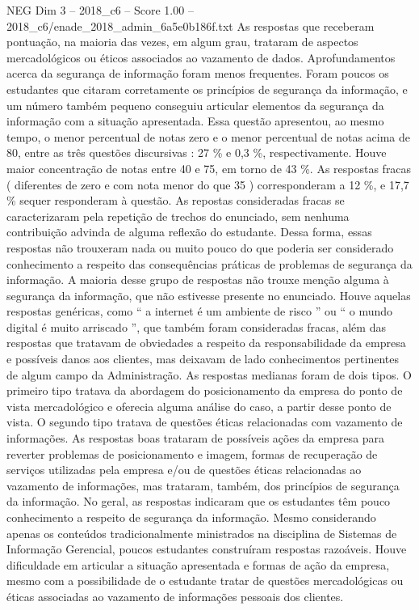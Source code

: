 \begin{textsample}{NEG Dim 3 – 2018\_c6 – Score 1.00 – 2018\_c6/enade\_2018\_admin\_6a5e0b186f.txt}
As respostas que receberam pontuação, na maioria das vezes, em algum grau, trataram de aspectos mercadológicos ou éticos associados ao vazamento de dados.
Aprofundamentos acerca da segurança de informação foram menos frequentes.
Foram poucos os estudantes que citaram corretamente os princípios de segurança da informação, e um número também pequeno conseguiu articular elementos da segurança da informação com a situação apresentada.
Essa questão apresentou, ao mesmo tempo, o menor percentual de notas zero e o menor percentual de notas acima de 80, entre as três questões discursivas : 27 \% e 0,3 \%, respectivamente.
Houve maior concentração de notas entre 40 e 75, em torno de 43 \%.
As respostas fracas ( diferentes de zero e com nota menor do que 35 ) corresponderam a 12 \%, e 17,7 \% sequer responderam à questão.
As repostas consideradas fracas se caracterizaram pela repetição de trechos do enunciado, sem nenhuma contribuição advinda de alguma reflexão do estudante.
Dessa forma, essas respostas não trouxeram nada ou muito pouco do que poderia ser considerado conhecimento a respeito das consequências práticas de problemas de segurança da informação.
A maioria desse grupo de respostas não trouxe menção alguma à segurança da informação, que não estivesse presente no enunciado.
Houve aquelas respostas genéricas, como “ a internet é um ambiente de risco ” ou “ o mundo digital é muito arriscado ”, que também foram consideradas fracas, além das respostas que tratavam de obviedades a respeito da responsabilidade da empresa e possíveis danos aos clientes, mas deixavam de lado conhecimentos pertinentes de algum campo da Administração.
As respostas medianas foram de dois tipos.
O primeiro tipo tratava da abordagem do posicionamento da empresa do ponto de vista mercadológico e oferecia alguma análise do caso, a partir desse ponto de vista.
O segundo tipo tratava de questões éticas relacionadas com vazamento de informações.
As respostas boas trataram de possíveis ações da empresa para reverter problemas de posicionamento e imagem, formas de recuperação de serviços utilizadas pela empresa e/ou de questões éticas relacionadas ao vazamento de informações, mas trataram, também, dos princípios de segurança da informação.
No geral, as respostas indicaram que os estudantes têm pouco conhecimento a respeito de segurança da informação.
Mesmo considerando apenas os conteúdos tradicionalmente ministrados na disciplina de Sistemas de Informação Gerencial, poucos estudantes construíram respostas razoáveis.
Houve dificuldade em articular a situação apresentada e formas de ação da empresa, mesmo com a possibilidade de o estudante tratar de questões mercadológicas ou éticas associadas ao vazamento de informações pessoais dos clientes.

\end{textsample}
